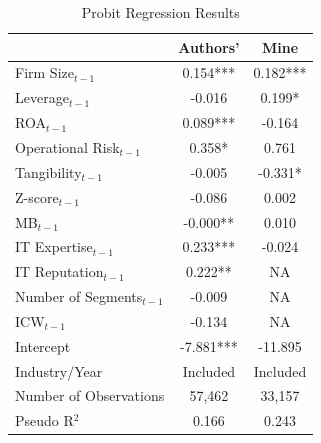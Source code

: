 \documentclass[11pt]{article}
\begin{document}
\begin{table}[ht]
  \centering
  \scriptsize
  \begin{tabular}{@{}lcc@{}}
    \toprule
                               & Authors'  & Mine     \\
    \midrule
    Firm Size$_{t-1}$          & 0.154***  & 0.182*** \\
    Leverage$_{t-1}$           & -0.016    & 0.199*   \\
    ROA$_{t-1}$                & 0.089***  & -0.164   \\
    Operational Risk$_{t-1}$   & 0.358*    & 0.761    \\
    Tangibility$_{t-1}$        & -0.005    & -0.331*  \\
    Z-score$_{t-1}$            & -0.086    & 0.002    \\
    MB$_{t-1}$                 & -0.000**  & 0.010    \\
    IT Expertise$_{t-1}$       & 0.233***  & -0.024   \\
    IT Reputation$_{t-1}$      & 0.222**   & NA       \\
    Number of Segments$_{t-1}$ & -0.009    & NA       \\
    ICW$_{t-1}$                & -0.134    & NA       \\
    Intercept                  & -7.881*** & -11.895  \\
    \midrule
    Industry/Year              & Included  & Included \\
    Number of Observations     & 57,462    & 33,157   \\
    Pseudo R$^2$               & 0.166     & 0.243    \\
    \bottomrule
  \end{tabular}
  \caption{Probit Regression Results}
  \label{tab:probit}
\end{table}
\end{document}
